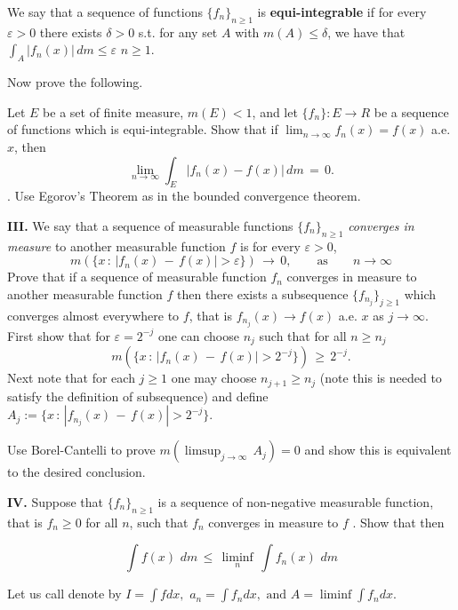 { We say that a sequence of functions $\{ f_n\}_{n\geq 1}$ is {\bf equi-integrable} if for every $\varepsilon >0$
there exists $\delta >0$ s.t.  for any set $A$ with $m(A) \leq \delta$, we have that $\int_A |f_n(x)| \, dm \leq \varepsilon$  $n \geq 1$. 

\smallskip

Now prove the following.   

\smallskip

Let $E$ be  a set of finite measure, $m(E) < 1$, and let $\{f_n\}: E \to R $ be a
sequence of functions which is equi-integrable. Show that if  $\lim_{n \to \infty} f_n(x) = f(x)$ a.e. $x$, then 
$$ \lim_{n \to \infty} \int_E |f_n(x) - f(x)| \, dm \, =\, 0.$$
. Use Egorov's Theorem as in the bounded convergence theorem.

\medskip

{\bf III.} We say that a sequence of measurable functions $\{f_n\}_{n\geq 1}$ {\it converges in measure} to another measurable function $f$ is for every $\varepsilon >0$, 
$$ m(\{ x \,:\, |f_n(x) \,- \, f(x)| > \varepsilon \} ) \, \to \, 0, \qquad \text{as} \qquad n \to \infty $$
Prove that if a sequence of measurable function $f_n$ converges in measure to another measurable function $f$ then there exists a subsequence $\{f_{n_j}\}_{j \geq 1}$ which converges almost everywhere to $f$, that is $ f_{n_j}(x) \to f(x)$ a.e. $x$ as $ j \to \infty$.
\smallskip
{} First  show that for $\varepsilon = 2^{-j}$ one can choose $n_j$ such that for all $n \geq n_j$ 
$$ m(\{ x \,:\, |f_n(x) \,- \, f(x)| > 2^{-j} \} ) \,  \geq \, 2^{-j}. $$
Next note that for each $j \geq 1$ one may choose $ n_{j+1} \geq n_j$  (note this is needed to satisfy the definition of subsequence) and
define $A_j:=  \{ x \,:\, |f_{n_j}(x) \,- \, f(x)| > 2^{-j} \} $. 

Use Borel-Cantelli to prove $m(\limsup_{j \to \infty}\, A_j) =0$ and show this is equivalent to the desired conclusion.

\medskip

{\bf IV.} Suppose that $\{f_n\}_{n \geq 1}$ is a sequence of non-negative measurable function, that is $f_n\geq 0$ for all $n$, such that $ f_n$ converges in measure to $f$ . Show that then 

$$ \int f(x) \, \, dm \, \leq \, \liminf_n \, \int f_n(x)\, \, dm $$

\smallskip
{}   Let us call denote by $I= \int f dx,  \, \,  a_n= \int f_n dx,  \, \,  \text{and} 
\, \,  A= \liminf \int f_n dx $.

}
